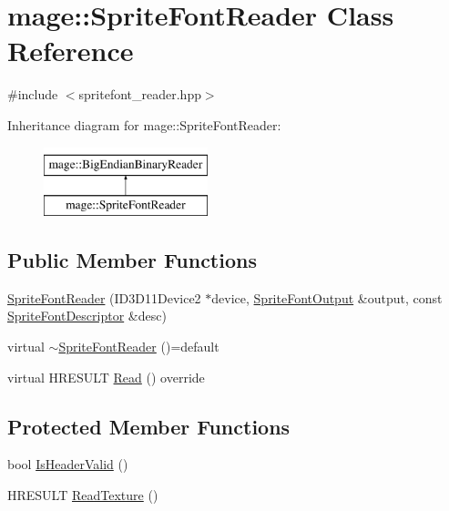\hypertarget{classmage_1_1_sprite_font_reader}{}\section{mage\+:\+:Sprite\+Font\+Reader Class Reference}
\label{classmage_1_1_sprite_font_reader}


{\ttfamily \#include $<$spritefont\+\_\+reader.\+hpp$>$}

Inheritance diagram for mage\+:\+:Sprite\+Font\+Reader\+:\begin{figure}[H]
\begin{center}
\leavevmode
\includegraphics[height=2.000000cm]{classmage_1_1_sprite_font_reader}
\end{center}
\end{figure}
\subsection*{Public Member Functions}
\begin{DoxyCompactItemize}
\item 
\hyperlink{classmage_1_1_sprite_font_reader_ab257bc3c1f787182c14da56545ff6d10}{Sprite\+Font\+Reader} (I\+D3\+D11\+Device2 $\ast$device, \hyperlink{structmage_1_1_sprite_font_output}{Sprite\+Font\+Output} \&output, const \hyperlink{structmage_1_1_sprite_font_descriptor}{Sprite\+Font\+Descriptor} \&desc)
\item 
virtual \hyperlink{classmage_1_1_sprite_font_reader_a296715f88672f810a6e4b74f74840c53}{$\sim$\+Sprite\+Font\+Reader} ()=default
\item 
virtual H\+R\+E\+S\+U\+LT \hyperlink{classmage_1_1_sprite_font_reader_a6bc9fa71b4c9d884ba939d99f4c9c0d7}{Read} () override
\end{DoxyCompactItemize}
\subsection*{Protected Member Functions}
\begin{DoxyCompactItemize}
\item 
bool \hyperlink{classmage_1_1_sprite_font_reader_aa6dd3fc28e531d6db6ecda6ce3535d4c}{Is\+Header\+Valid} ()
\item 
H\+R\+E\+S\+U\+LT \hyperlink{classmage_1_1_sprite_font_reader_a0ab2521309a82f1160e4839b8ca6e400}{Read\+Texture} ()
\end{DoxyCompactItemize}
